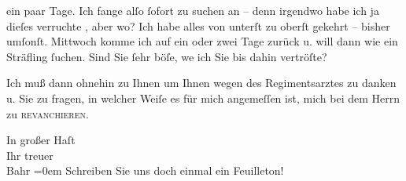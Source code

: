                ein paar Tage. Ich fange alſo{ }ſofort zu suchen an – denn irgendwo habe ich ja dieſes
               verruchte \label{K_L00252-2v}\label{K_L00252-2}, aber wo? Ich habe alles von unterſt zu oberſt gekehrt –
               bisher umſonſt. Mittwoch komme ich {\pb}auf ein oder
               zwei Tage zurück u. will dann wie ein Sträfling{ }ſuchen. Sind Sie{ }ſehr böſe, we{\geminationn} ich Sie bis dahin vertröſte?\pend
           
\pstart
           Ich muß dann ohnehin zu Ihnen um Ihnen wegen des Regimentsarztes zu danken u. Sie zu fragen, in welcher
               Weiſe es für mich angemeſſen ist, mich bei dem Herrn zu \textsc{revan{\pb}chieren}.\pend
           
\pstart
           In großer Haſt{\\[\baselineskip]}Ihr treuer{\\[\baselineskip]}\spacefill\mbox{Bahr}\pend
           \leftskip=0em{}
\pstart
           \noindent{}Schreiben Sie uns doch einmal ein Feuilleton!\pend
           \endnumbering{}  \newcommand{\dateiname}{L00252}\newcommand{\titel}{Hermann Bahr an Arthur Schnitzler, [12. 8. 1893]}\newcommand{\editorInnen}{Herausgegeben von Martin Anton Müller}
